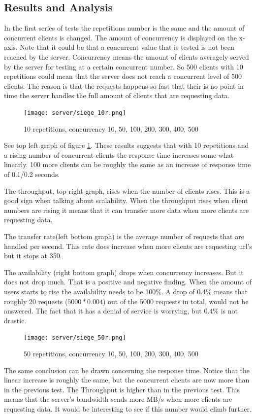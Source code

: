 \subsection{Results and Analysis}
In the first series of tests the repetitions number is the same and the amount of concurrent clients is changed. The amount of concurrency is displayed on the x-axis. Note that it could be that a concurrent value that is tested is not been reached by the server. Concurrency means the amount of clients averagely served by the server for testing at a certain concurrent number. So 500 clients with 10 repetitions could mean that the server does not reach a concurrent level of 500 clients. The reason is that the requests happens so fast that their is no point in time the server handles the full amount of clients that are requesting data.
\begin{figure}[H]
\center
\texttt{[image: server/siege\_10r.png]}
\caption{10 repetitions, concurrency 10, 50, 100, 200, 300, 400, 500}
\label{fig:10r}
\end{figure}
See top left graph of figure \ref{fig:10r}. These results suggests that with 10 repetitions and a rising number of concurrent clients the response time increases some what linearly.  100 more clients can be roughly the same as an increase of response time of 0.1/0.2 seconds. 

The throughput, top right graph, rises when the number of clients rises. This is a good sign when talking about scalability. When the throughput rises when client numbers are rising it means that it can transfer more data when more clients are requesting data. 

The transfer rate(left bottom graph) is the average number of requests that are handled per second. This rate does increase when more clients are requesting url's but it stops at 350.

The availability (right bottom graph) drops when concurrency increases. But it does not drop much. That is a positive and negative finding. When the amount of users starts to rise the availability needs to be 100\%. A drop of 0.4\% means that roughly 20 requests ($5000 * 0.004$) out of the 5000 requests in total, would not be answered. The fact that it has a denial of service is worrying, but 0.4\% is not drastic.	

\vspace{0.5cm}
\begin{figure}[H]
\center
\texttt{[image: server/siege\_50r.png]}
\caption{50 repetitions, concurrency 10, 50, 100, 200, 300, 400, 500}
\end{figure}
The same conclusion can be drawn concerning the response time. Notice that the linear increase is roughly the same, but the concurrent clients are now more than in the previous test.
The Throughput is higher than in the previous test. This means that the server's bandwidth sends more MB/s when more clients are requesting data. It would be interesting to see if this number would climb further.

